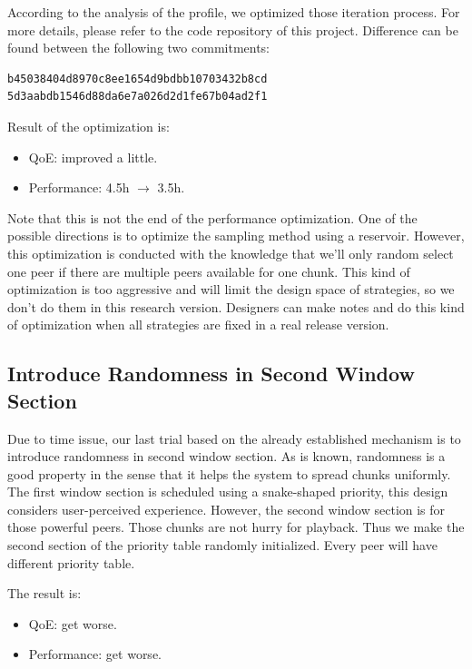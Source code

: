 \documentclass[11pt,a4paper]{article}
\begin{document}
According to the analysis of the profile, we optimized those iteration 
process. For more details, please refer to the code repository 
of this project. Difference can be found between the following 
two commitments:
\begin{Verbatim}
b45038404d8970c8ee1654d9bdbb10703432b8cd
5d3aabdb1546d88da6e7a026d2d1fe67b04ad2f1
\end{Verbatim}

Result of the optimization is:
\begin{itemize}
	\item QoE: improved a little. 
	\item Performance: 4.5h $\rightarrow$ 3.5h. 
\end{itemize}

Note that this is not the end of the performance optimization. 
One of the possible directions is to optimize the sampling 
method using a reservoir\cite{vitter1985-random-reservoir}. 
However, this optimization is conducted with the knowledge 
that we'll only random select one peer if there are multiple peers
available for one chunk. This kind of optimization is too aggressive
and will limit the design space of strategies, so we don't do 
them in this research version. Designers can make notes 
and do this kind of optimization when all strategies are fixed 
in a real release version. 

\subsection{Introduce Randomness in Second Window Section}

Due to time issue, our last trial based on the already established 
mechanism is to introduce randomness in second window section. 
As is known, randomness is a good property in the sense 
that it helps the system to spread chunks uniformly. The first window
section is scheduled using a snake-shaped priority, this design considers
user-perceived experience. However, the second window section is for
those powerful peers. Those chunks are not hurry for playback. Thus 
we make the second section of the priority table randomly initialized. 
Every peer will have different priority table. 

The result is:
\begin{itemize}
	\item QoE: get worse. 
	\item Performance: get worse. 
\end{itemize}
\end{document}
